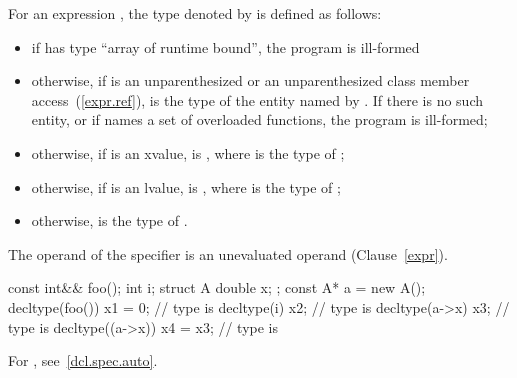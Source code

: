 \pnum
{}%
For an expression , the type denoted by  is defined as follows:
\begin{itemize}
\item if  has type ``array of runtime bound'', the program is
ill-formed

\item otherwise, if  is an unparenthesized
 or an unparenthesized class
member access~(\ref{expr.ref}),  is the
type of the entity named by . If there is no such entity, or
if  names a set of overloaded functions, the program is
ill-formed;

\item otherwise, if  is
an xvalue,  is , where  is the type
of ;

\item otherwise, if  is an lvalue, 
is , where  is the type of ;

\item otherwise,  is the type of .
\end{itemize}

The operand of the  specifier is an unevaluated
operand (Clause~\ref{expr}).

\enterexample
\begin{codeblock}
const int&& foo();
int i;
struct A { double x; };
const A* a = new A();
decltype(foo()) x1 = 0;         // type is 
decltype(i) x2;                 // type is 
decltype(a->x) x3;              // type is 
decltype((a->x)) x4 = x3;       // type is 
\end{codeblock}
\exitexample

For , see~\ref{dcl.spec.auto}.

